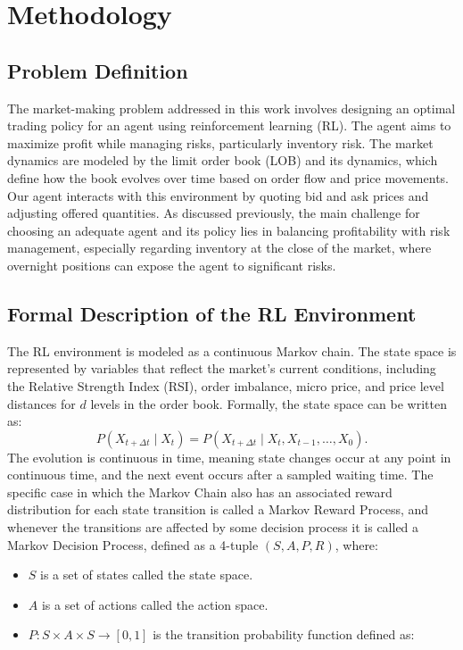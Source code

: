 \section{Methodology}

\subsection{Problem Definition}
The market-making problem addressed in this work involves designing an optimal trading policy for an agent using reinforcement learning (RL). The agent aims to maximize profit while managing risks, particularly inventory risk. The market dynamics are modeled by the limit order book (LOB) and its dynamics, which define how the book evolves over time based on order flow and price movements. Our agent interacts with this environment by quoting bid and ask prices and adjusting offered quantities. As discussed previously, the main challenge for choosing an adequate agent and its policy lies in balancing profitability with risk management, especially regarding inventory at the close of the market, where overnight positions can expose the agent to significant risks.

\subsection{Formal Description of the RL Environment}
The RL environment is modeled as a continuous Markov chain. The state space is represented by variables that reflect the market's current conditions, including the Relative Strength Index (RSI), order imbalance, micro price, and price level distances for \(d\) levels in the order book. Formally, the state space can be written as:
$$
P(X_{t + \Delta t} \mid X_t) = P(X_{t + \Delta t} \mid X_{t}, X_{t - 1}, \dots, X_0).
$$
The evolution is continuous in time, meaning state changes occur at any point in continuous time, and the next event occurs after a sampled waiting time. The specific case in which the Markov Chain also has an associated reward distribution for each state transition is called a Markov Reward Process, and whenever the transitions are affected by some decision process it is called a Markov Decision Process, defined as a 4-tuple \( (S, A, P, R) \), where:

\begin{itemize}
	\item \( S \) is a set of states called the state space.
	\item \( A \) is a set of actions called the action space.
	\item \( P: S \times A \times S \to [0, 1] \) is the transition probability function defined as:
\end{itemize}

